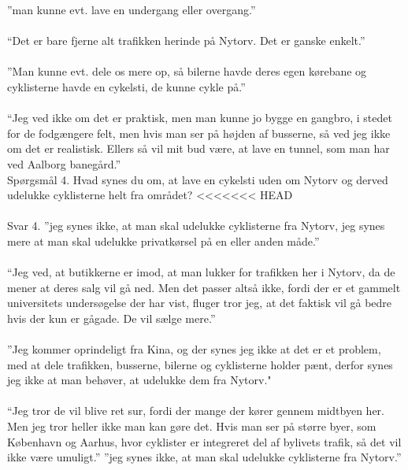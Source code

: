   ”man kunne evt. lave en undergang eller overgang.”
\\\\
  “Det er bare fjerne alt trafikken herinde på Nytorv. Det er ganske enkelt.”
\\\\
  ”Man kunne evt. dele os mere op, så bilerne havde deres egen kørebane og cyklisterne havde en cykelsti, de kunne cykle på.”
\\\\
  “Jeg ved ikke om det er praktisk, men man kunne jo bygge en gangbro, i stedet for de fodgængere felt, men hvis man ser på højden af busserne, så ved jeg ikke om det er realistisk. Ellers så vil mit bud være, at lave en tunnel, som man har ved Aalborg banegård.”
\\
Spørgsmål 4.
Hvad synes du om, at lave en cykelsti uden om Nytorv og derved udelukke cyklisterne helt fra området?
<<<<<<< HEAD
\\\\
  Svar 4.
  ”jeg synes ikke, at man skal udelukke cyklisterne fra Nytorv, jeg synes mere at man skal udelukke privatkørsel på en eller anden måde.”
\\\\
  “Jeg ved, at butikkerne er imod, at man lukker for trafikken her i Nytorv, da de mener at deres salg vil gå ned. Men det passer altså ikke, fordi der er et gammelt universitets undersøgelse der har vist, fluger tror jeg, at det faktisk vil gå bedre hvis der kun er gågade. De vil sælge mere.”
\\\\
  ”Jeg kommer oprindeligt fra Kina, og der synes jeg ikke at det er et problem, med at dele trafikken, busserne, bilerne og cyklisterne holder pænt, derfor synes jeg ikke at man behøver, at udelukke dem fra Nytorv."
\\\\
  “Jeg tror de vil blive ret sur, fordi der mange der kører gennem midtbyen her. Men jeg tror heller ikke man kan gøre det. Hvis man ser på større byer, som København og Aarhus, hvor cyklister er integreret del af bylivets trafik, så det vil ikke være umuligt.”
  ”jeg synes ikke, at man skal udelukke cyklisterne fra Nytorv.”
\\\\

